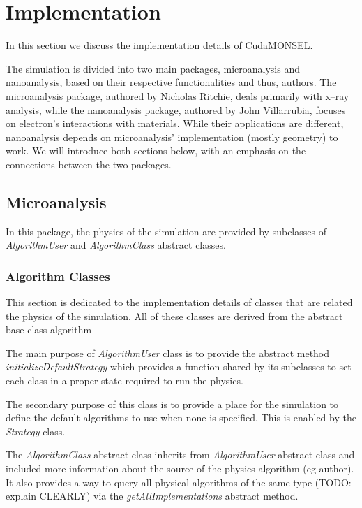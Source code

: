 \chapter{Implementation}\label{impl}
In this section we discuss the implementation details of CudaMONSEL.

The simulation is divided into two main packages, microanalysis and nanoanalysis, based on their respective functionalities and thus, authors. The microanalysis package, authored by Nicholas Ritchie, deals primarily with x--ray analysis, while the nanoanalysis package, authored by John Villarrubia, focuses on electron's interactions with materials. While their applications are different, nanoanalysis depends on microanalysis' implementation (mostly geometry) to work. We will introduce both sections below, with an emphasis on the connections between the two packages.

\section{Microanalysis}
In this package, the physics of the simulation are provided by subclasses of \emph{AlgorithmUser} and \emph{AlgorithmClass} abstract classes.

\subsection{Algorithm Classes}
This section is dedicated to the implementation details of classes that are related the physics of the simulation. All of these classes are derived from the abstract base class algorithm 

The main purpose of \emph{AlgorithmUser} class is to provide the abstract method \emph{initializeDefaultStrategy} which provides a function shared by its subclasses to set each class in a proper state required to run the physics. 

The secondary purpose of this class is to provide a place for the simulation to define the default algorithms to use when none is specified. This is enabled by the \emph{Strategy} class.

The \emph{AlgorithmClass} abstract class inherits from \emph{AlgorithmUser} abstract class and included more information about the source of the physics algorithm (eg author). It also provides a way to query all physical algorithms of the same type (TODO: explain CLEARLY) via the \emph{getAllImplementations} abstract method.

\subsubsection{}

